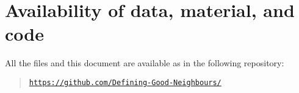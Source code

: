 \documentclass[a4paper,doc,11pt]{article}
\begin{document}
\section*{Availability of data, material, and code}
{

All the files and this document are available as in the following repository:
\begin{quote}
    \noindent \href{https://github.com/Defining-Good-Neighbours/}{\texttt{https://github.com/Defining-Good-Neighbours/}}
\end{quote}



}




\end{document}
